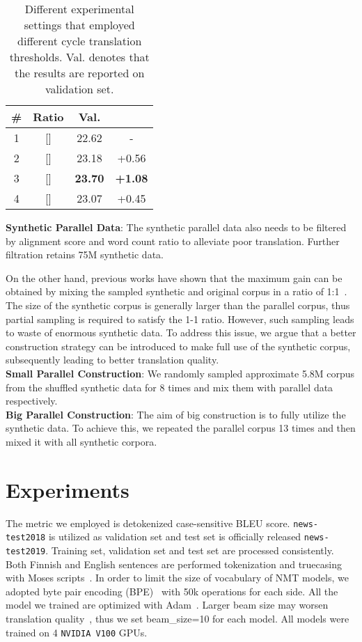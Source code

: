\documentclass[11pt,a4paper]{article}
\begin{document}
\begin{table}[t]
\centering
    \begin{tabular}{c|c||cc}
    \textbf{\#} &  \textbf{  Ratio} & \textbf{Val.} & \\
    \hline\hline
    1&[]&22.62&-\\
    2&[]&23.18&+0.56\\
    3&[]&\textbf{23.70}&\textbf{+1.08}\\
    4&[]&23.07&+0.45\\
    \end{tabular}
    \caption{Different experimental settings that employed different cycle translation thresholds. Val. denotes that the results are reported on validation set.}
    \label{tab:thresholds}
\end{table}

\textbf{Synthetic Parallel Data}:
The synthetic parallel data also needs to be filtered by alignment score and word count ratio to alleviate poor translation. Further filtration retains 75M synthetic data. 

On the other hand, previous works have shown that the maximum gain can be obtained by mixing the sampled synthetic and original corpus in a ratio of 1:1~\cite{sennrich2015improving,sennrich-etal-2016-edinburgh}. The size of the synthetic corpus is generally larger than the parallel corpus, thus partial sampling is required to satisfy the 1-1 ratio. However, such sampling leads to waste of enormous synthetic data. To address this issue, we argue that a better construction strategy can be introduced to make full use of the synthetic corpus, subsequently leading to better translation quality.\\

\textbf{Small Parallel Construction}:
We randomly sampled approximate 5.8M corpus from the shuffled synthetic data for 8 times and mix them with parallel data respectively. \\

\textbf{Big Parallel Construction}:
The aim of big construction is to fully utilize the synthetic data. To achieve this, we repeated the parallel corpus 13 times and then mixed it with all synthetic corpora.



\section{Experiments}
\label{sec:exp}
The metric we employed is detokenized case-sensitive BLEU score. \verb|news-test2018| is utilized as validation set and test set is officially released \verb|news-test2019|. Training set, validation set and test set are processed consistently. Both Finnish and English sentences are performed tokenization and truecasing with Moses scripts~\cite{Koehn2007MosesOS}. In order to limit the size of vocabulary of NMT models, we adopted byte pair encoding (BPE)~\cite{sennrich-etal-2016-edinburgh} with 50k operations for each side. All the model we trained are optimized with Adam~\cite{kingma2014adam}. Larger beam size may worsen translation quality~\cite{koehn-knowles-2017-six}, thus we set beam\_size=10 for each model. All models were trained on 4 \verb|NVIDIA V100| GPUs.
\end{document}
